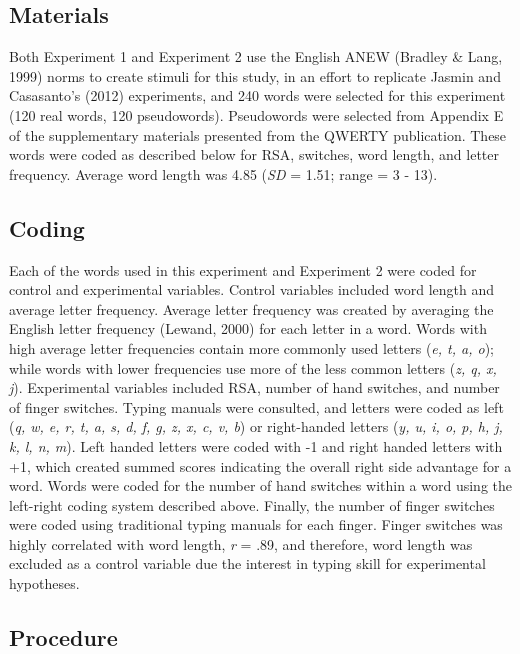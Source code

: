 \documentclass[english,man]{apa6}
\theoremstyle{definition}
\theoremstyle{definition}
\theoremstyle{definition}
\theoremstyle{remark}
\begin{document}
\subsection{Materials}\label{materials}

Both Experiment 1 and Experiment 2 use the English ANEW (Bradley \&
Lang, 1999) norms to create stimuli for this study, in an effort to
replicate Jasmin and Casasanto's (2012) experiments, and 240 words were
selected for this experiment (120 real words, 120 pseudowords).
Pseudowords were selected from Appendix E of the supplementary materials
presented from the QWERTY publication. These words were coded as
described below for RSA, switches, word length, and letter frequency.
Average word length was 4.85 (\emph{SD} = 1.51; range = 3 - 13).

\subsection{Coding}\label{coding}

Each of the words used in this experiment and Experiment 2 were coded
for control and experimental variables. Control variables included word
length and average letter frequency. Average letter frequency was
created by averaging the English letter frequency (Lewand, 2000) for
each letter in a word. Words with high average letter frequencies
contain more commonly used letters (\emph{e, t, a, o}); while words with
lower frequencies use more of the less common letters (\emph{z, q, x,
j}). Experimental variables included RSA, number of hand switches, and
number of finger switches. Typing manuals were consulted, and letters
were coded as left (\emph{q, w, e, r, t, a, s, d, f, g, z, x, c, v, b})
or right-handed letters (\emph{y, u, i, o, p, h, j, k, l, n, m}). Left
handed letters were coded with -1 and right handed letters with +1,
which created summed scores indicating the overall right side advantage
for a word. Words were coded for the number of hand switches within a
word using the left-right coding system described above. Finally, the
number of finger switches were coded using traditional typing manuals
for each finger. Finger switches was highly correlated with word length,
\emph{r} = .89, and therefore, word length was excluded as a control
variable due the interest in typing skill for experimental hypotheses.

\subsection{Procedure}\label{procedure}
\end{document}
